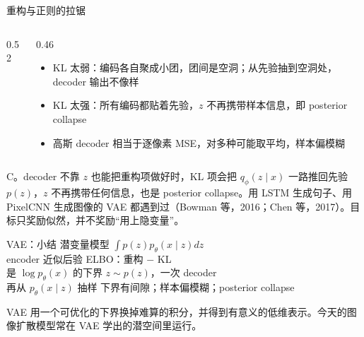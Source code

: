\documentclass[aspectratio=169,10pt,UTF8,fontset=none]{ctexbeamer}
\begin{document}
\begin{frame}{重构与正则的拉锯}
  \begin{columns}[c]
    \begin{column}{0.52\textwidth}
      \centering
      \par\vspace{1mm}
      {\scriptsize{}}
    \end{column}
    \begin{column}{0.46\textwidth}
      \begin{itemize}
        \item KL 太弱：编码各自聚成小团，团间是空洞；从先验抽到空洞处，decoder 输出不像样
        \item KL 太强：所有编码都贴着先验，$z$ 不再携带样本信息，即 posterior collapse
        \item 高斯 decoder 相当于逐像素 MSE，对多种可能取平均，样本偏模糊
      \end{itemize}
    \end{column}
  \end{columns}
  \vfill
  \begin{answer}
    C。decoder 不靠 $z$ 也能把重构项做好时，KL 项会把 $q_\phi(z\mid x)$ 一路推回先验 $p(z)$，$z$ 不再携带任何信息，也是 posterior collapse。用 LSTM 生成句子、用 PixelCNN 生成图像的 VAE 都遇到过（Bowman 等，2016；Chen 等，2017）。目标只奖励似然，并不奖励“用上隐变量”。
  \end{answer}
\end{frame}

\begin{frame}{VAE：小结}
  \centering
  \fourcard%
    {潜变量模型 $\int p(z)p_\theta(x\mid z)dz$\\encoder 近似后验}%
    {ELBO：重构 $-$ KL\\是 $\log p_\theta(x)$ 的下界}%
    {$z\sim p(z)$，一次 decoder\\再从 $p_\theta(x\mid z)$ 抽样}%
    {下界有间隙；样本偏模糊；posterior collapse}
  \vfill
  \begin{takeaway}
    VAE 用一个可优化的下界换掉难算的积分，并得到有意义的低维表示。今天的图像扩散模型常在 VAE 学出的潜空间里运行。
  \end{takeaway}
\end{frame}
\end{document}
